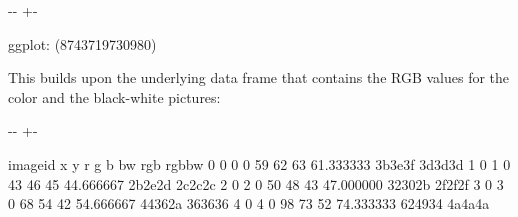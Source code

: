 \documentclass[letterpaper,10pt,english]{sphinxmanual}
\newlength\nbsphinxcodecellspacing
\begin{document}
{

\kern-\sphinxverbatimsmallskipamount\kern-\baselineskip
\kern+\FrameHeightAdjust\kern-\fboxrule
\vspace{\nbsphinxcodecellspacing}

\begin{sphinxVerbatim}[commandchars=\\\{\}]
\llap{\color{nbsphinxout}[3]:\,\hspace{\fboxrule}\hspace{\fboxsep}}\PYGZlt{}ggplot: (8743719730980)\PYGZgt{}
\end{sphinxVerbatim}
}

This builds upon the underlying data frame that contains the RGB values for the color and the black-white pictures:

{
\begin{sphinxVerbatim}[commandchars=\\\{\}]
\llap{\color{nbsphinxin}[4]:\,\hspace{\fboxrule}\hspace{\fboxsep}}  
\end{sphinxVerbatim}
}

{

\kern-\sphinxverbatimsmallskipamount\kern-\baselineskip
\kern+\FrameHeightAdjust\kern-\fboxrule
\vspace{\nbsphinxcodecellspacing}

\begin{sphinxVerbatim}[commandchars=\\\{\}]
\llap{\color{nbsphinxout}[4]:\,\hspace{\fboxrule}\hspace{\fboxsep}}   image\PYGZus{}id  x  y   r   g   b         bw      rgb   rgb\PYGZus{}bw
0         0  0  0  59  62  63  61.333333  \PYGZsh{}3b3e3f  \PYGZsh{}3d3d3d
1         0  1  0  43  46  45  44.666667  \PYGZsh{}2b2e2d  \PYGZsh{}2c2c2c
2         0  2  0  50  48  43  47.000000  \PYGZsh{}32302b  \PYGZsh{}2f2f2f
3         0  3  0  68  54  42  54.666667  \PYGZsh{}44362a  \PYGZsh{}363636
4         0  4  0  98  73  52  74.333333  \PYGZsh{}624934  \PYGZsh{}4a4a4a
\end{sphinxVerbatim}
}
\end{document}
